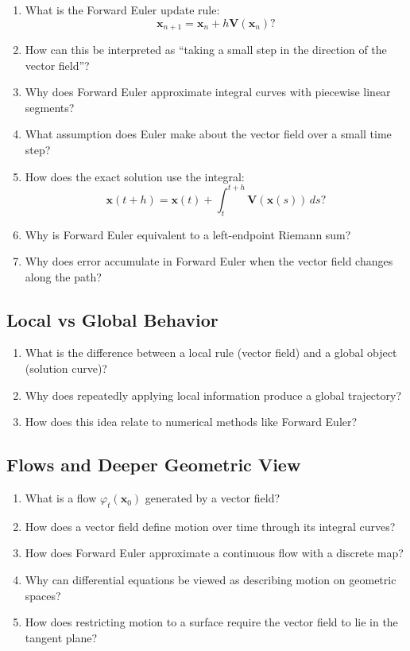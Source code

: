 \begin{enumerate}[resume]
  \item What is the Forward Euler update rule:
    \[ \mathbf{x}_{n+1}= \mathbf{x}_{n} + h \mathbf{V}(\mathbf{x}_{n}) ? \]
  \item How can this be interpreted as ``taking a small step in the direction of the vector field''?
  \item Why does Forward Euler approximate integral curves with piecewise linear segments?
  \item What assumption does Euler make about the vector field over a small time step?
  \item How does the exact solution use the integral:
    \[ \mathbf{x}(t+h) = \mathbf{x}(t) + \int_{t}^{t+h}\mathbf{V}(\mathbf{x}(s))\,ds ? \]
  \item Why is Forward Euler equivalent to a left-endpoint Riemann sum?
  \item Why does error accumulate in Forward Euler when the vector field changes along the path?
\end{enumerate}

\subsection{Local vs Global Behavior}

\begin{enumerate}[resume]
  \item What is the difference between a local rule (vector field) and a global object (solution curve)?
  \item Why does repeatedly applying local information produce a global trajectory?
  \item How does this idea relate to numerical methods like Forward Euler?
\end{enumerate}

\subsection{Flows and Deeper Geometric View}

\begin{enumerate}[resume]
  \item What is a flow \(\varphi_{t}(\mathbf{x}_{0})\) generated by a vector field?
  \item How does a vector field define motion over time through its integral curves?
  \item How does Forward Euler approximate a continuous flow with a discrete map?
  \item Why can differential equations be viewed as describing motion on geometric spaces?
  \item How does restricting motion to a surface require the vector field to lie in the tangent plane?
\end{enumerate}
